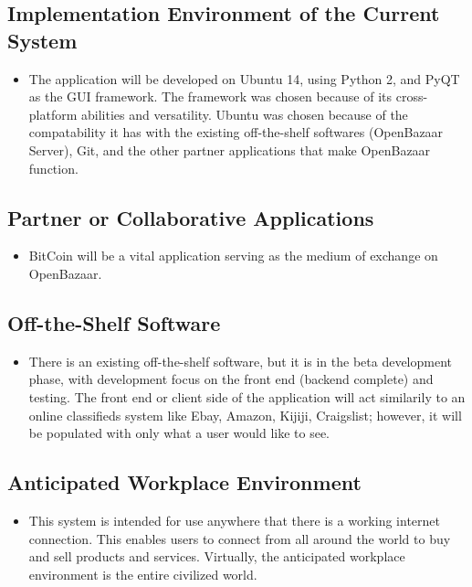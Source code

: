 \documentclass{article}
\begin{document}
\subsection{Implementation Environment of the Current System}

\begin{itemize}
\item
The application will be developed on Ubuntu 14, using Python 2, and PyQT as the GUI framework. The framework was chosen because of its cross-platform abilities and versatility. Ubuntu was chosen because of the compatability it has with the existing off-the-shelf softwares (OpenBazaar Server), Git, and the other partner applications that make OpenBazaar function. 
\end{itemize}

\subsection{Partner or Collaborative Applications}
\begin{itemize}

\item
BitCoin will be a vital application serving as the medium of exchange on OpenBazaar.

\end{itemize}

\subsection{Off-the-Shelf Software}
\begin{itemize}
	
\item
There is an existing off-the-shelf software, but it is in the beta development phase, with development focus on the front end (backend complete) and testing. The front end or client side of the application will act similarily to an online classifieds system like Ebay, Amazon, Kijiji, Craigslist; however, it will be populated with only what a user would like to see.	

	
\end{itemize}

\subsection{Anticipated Workplace Environment}
\begin{itemize}
	
\item
This system is intended for use anywhere that there is a working internet connection. This enables users to connect from all around the world to buy and sell products and services. Virtually, the anticipated workplace environment is the entire civilized world.
	
	
\end{itemize}
\end{document}
